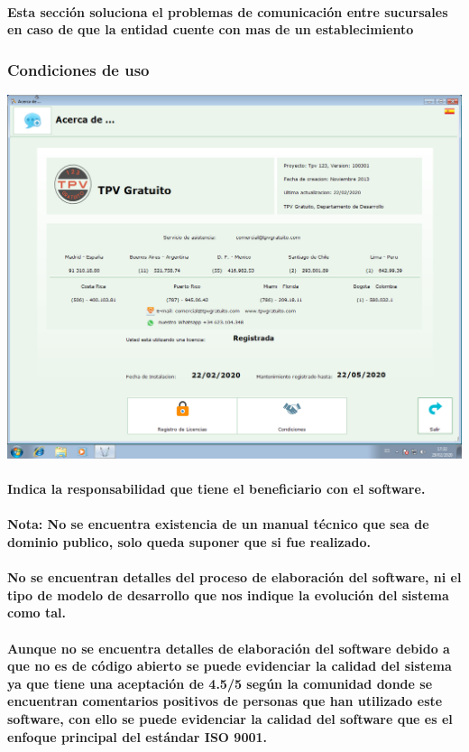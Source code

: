 \documentclass[12pt,a4paper]{ articule }
\begin{document}
\paragraph{Esta sección soluciona el problemas de comunicación entre sucursales en caso de que la entidad cuente con mas de un establecimiento} 

\subsubsection*{Condiciones de uso }
\includegraphics[scale=0.35]{Acerca de.png} 
\paragraph{Indica la responsabilidad que tiene el beneficiario con el software.}

\paragraph{Nota: No se encuentra existencia de un manual técnico que sea de dominio publico, solo queda suponer que si fue realizado.}
\paragraph{No se encuentran detalles del proceso de elaboración del software, ni el tipo de modelo de desarrollo que nos indique la evolución del sistema como tal.}
\paragraph{Aunque no se encuentra detalles de elaboración del software debido a que no es de código abierto se puede evidenciar la calidad del sistema ya que tiene una aceptación de 4.5/5 según la comunidad donde se encuentran comentarios positivos de personas que han utilizado este software, con ello se puede evidenciar la calidad del software que es el enfoque principal del estándar ISO 9001.}
\end{document}
